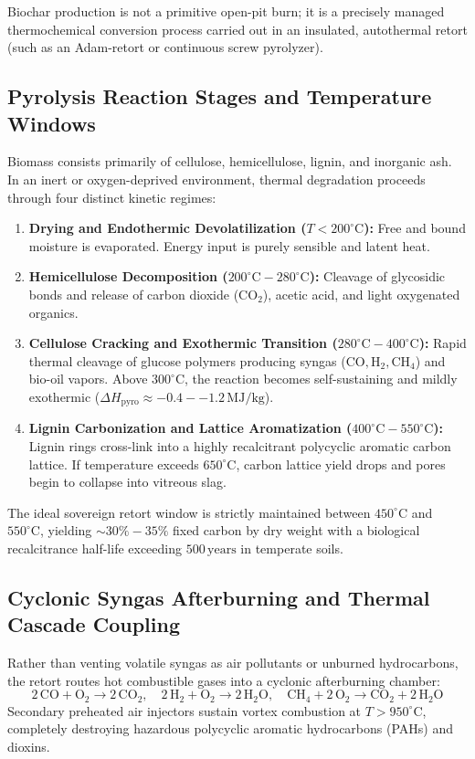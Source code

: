 Biochar production is not a primitive open-pit burn; it is a precisely managed thermochemical conversion process carried out in an insulated, autothermal retort (such as an Adam-retort or continuous screw pyrolyzer).

\subsection{Pyrolysis Reaction Stages and Temperature Windows}
Biomass consists primarily of cellulose, hemicellulose, lignin, and inorganic ash. In an inert or oxygen-deprived environment, thermal degradation proceeds through four distinct kinetic regimes:
\begin{enumerate}
    \item \textbf{Drying and Endothermic Devolatilization ($T < 200^\circ\mathrm{C}$):} Free and bound moisture is evaporated. Energy input is purely sensible and latent heat.
    \item \textbf{Hemicellulose Decomposition ($200^\circ\mathrm{C} - 280^\circ\mathrm{C}$):} Cleavage of glycosidic bonds and release of carbon dioxide ($\mathrm{CO}_2$), acetic acid, and light oxygenated organics.
    \item \textbf{Cellulose Cracking and Exothermic Transition ($280^\circ\mathrm{C} - 400^\circ\mathrm{C}$):} Rapid thermal cleavage of glucose polymers producing syngas ($\mathrm{CO}, \mathrm{H}_2, \mathrm{CH}_4$) and bio-oil vapors. Above $300^\circ\mathrm{C}$, the reaction becomes self-sustaining and mildly exothermic ($\Delta H_{\mathrm{pyro}} \approx -0.4 - -1.2\,\mathrm{MJ/kg}$).
    \item \textbf{Lignin Carbonization and Lattice Aromatization ($400^\circ\mathrm{C} - 550^\circ\mathrm{C}$):} Lignin rings cross-link into a highly recalcitrant polycyclic aromatic carbon lattice. If temperature exceeds $650^\circ\mathrm{C}$, carbon lattice yield drops and pores begin to collapse into vitreous slag.
\end{enumerate}
The ideal sovereign retort window is strictly maintained between $450^\circ\mathrm{C}$ and $550^\circ\mathrm{C}$, yielding $\sim 30\% - 35\%$ fixed carbon by dry weight with a biological recalcitrance half-life exceeding $500\,\mathrm{years}$ in temperate soils.

\subsection{Cyclonic Syngas Afterburning and Thermal Cascade Coupling}
Rather than venting volatile syngas as air pollutants or unburned hydrocarbons, the retort routes hot combustible gases into a cyclonic afterburning chamber:
\begin{equation}
2\,\mathrm{CO} + \mathrm{O}_2 \to 2\,\mathrm{CO}_2, \quad 2\,\mathrm{H}_2 + \mathrm{O}_2 \to 2\,\mathrm{H}_2\mathrm{O}, \quad \mathrm{CH}_4 + 2\,\mathrm{O}_2 \to \mathrm{CO}_2 + 2\,\mathrm{H}_2\mathrm{O}
\label{eq:syngas_combustion}
\end{equation}
Secondary preheated air injectors sustain vortex combustion at $T > 950^\circ\mathrm{C}$, completely destroying hazardous polycyclic aromatic hydrocarbons (PAHs) and dioxins. 

